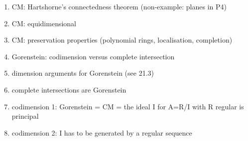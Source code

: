 \documentclass[10pt,a4paper]{article}
\begin{document}
\begin{enumerate}
  \item CM: Hartshorne's connectedness theorem (non-example: planes in P4)
  \item CM: equidimensional
  \item CM: preservation properties (polynomial rings, localisation, completion)
  \item Gorenstein: codimension versus complete intersection
  \item dimension arguments for Gorenstein (see 21.3)
  \item complete intersections are Gorenstein
  \item codimension 1: Gorenstein = CM = the ideal I for A=R/I with R regular is principal
  \item codimension 2: I has to be generated by a regular sequence
\end{enumerate}

\printbibliography
\end{document}
